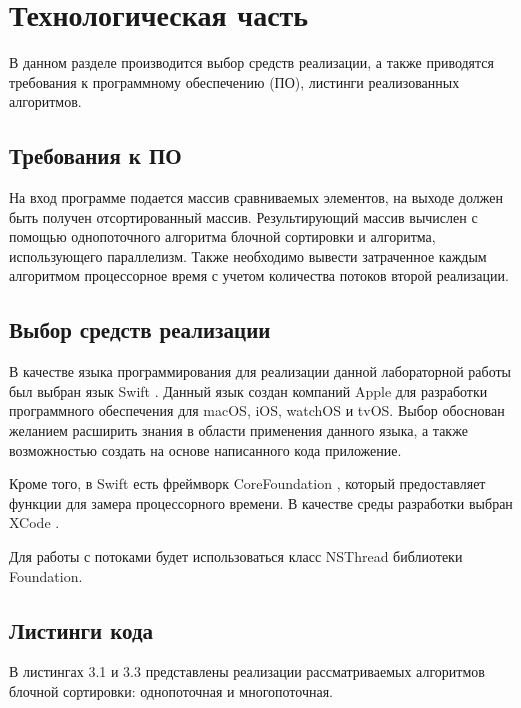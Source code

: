 \chapter{Технологическая часть}

В данном разделе производится выбор средств реализации, а также приводятся требования к программному обеспечению (ПО), листинги реализованных алгоритмов.

\section{Требования к ПО}

На вход программе подается массив сравниваемых элементов, на выходе должен быть получен отсортированный массив. Результирующий массив вычислен с помощью однопоточного алгоритма блочной сортировки и алгоритма, использующего параллелизм. Также необходимо вывести затраченное каждым алгоритмом процессорное время с учетом количества потоков второй реализации.

\section{Выбор средств реализации}

В качестве языка программирования для реализации данной лабораторной работы был выбран язык Swift \cite{swift}. Данный язык создан компаний Apple для разработки программного обеспечения для macOS, iOS, watchOS и tvOS. Выбор обоснован желанием расширить знания в области применения данного языка, а также возможностью создать на основе написанного кода приложение.

Кроме того, в Swift есть фреймворк CoreFoundation \cite{core}, который предоставляет функции для замера процессорного времени. В качестве среды разработки выбран XCode \cite{xcode}. 

Для работы с потоками будет использоваться класс NSThread \cite{thread} библиотеки Foundation. 

\section{Листинги кода}

В листингах 3.1 и 3.3 представлены реализации рассматриваемых алгоритмов блочной сортировки: однопоточная и многопоточная. 

